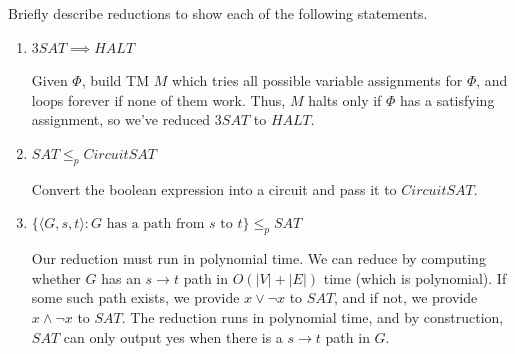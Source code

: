\documentclass[fleqn]{article}
\begin{document}
\noindent Briefly describe reductions to show each of the following statements.
\begin{enumerate}
    \item $3SAT \implies HALT$
    \begin{answer}
        Given $\Phi$, build TM $M$ which tries all possible variable assignments for $\Phi$, and loops forever if none of them work. Thus, $M$ halts only if $\Phi$ has a satisfying assignment, so we've reduced $3SAT$ to $HALT$.
    \end{answer}
    \item $SAT \leq_p CircuitSAT$
    \begin{answer}
        Convert the boolean expression into a circuit and pass it to $CircuitSAT$.
    \end{answer}
    \item $\{\langle G, s, t \rangle : \text{$G$ has a path from $s$ to $t$}\} \leq_p SAT$
    \begin{answer}
        Our reduction must run in polynomial time. We can reduce by computing whether $G$ has an $s \to t$ path in $O(|V| + |E|)$ time (which is polynomial). If some such path exists, we provide $x \vee \neg x$ to $SAT$, and if not, we provide $x \wedge \neg x$ to $SAT$. The reduction runs in polynomial time, and by construction, $SAT$ can only output yes when there is a $s \to t$ path in $G$.
    \end{answer}
\end{enumerate}
\end{document}
